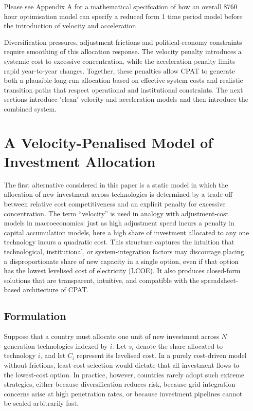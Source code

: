 \documentclass[preprint,authoryear,12pt]{elsarticle}
\begin{document}
Please see Appendix A for a mathematical specifcation of how an overall 8760 hour optimisation model can specify a reduced form 1 time period model before the introduction of velocity and acceleration.


Diversification pressures, adjustment frictions and political-economy
constraints require smoothing of this allocation response. The velocity penalty introduces a systemic cost to excessive concentration, while the acceleration penalty limits rapid year-to-year
changes. Together, these penalties allow CPAT to generate both a plausible long-run allocation
based on effective system costs and realistic transition paths that respect operational and
institutional constraints. The next sections introduce 'clean' velocity and acceleration models and then introduce the combined system.


\newpage

\section{A Velocity-Penalised Model of Investment Allocation}

The first alternative considered in this paper is a static model in which the allocation of new
investment across technologies is determined by a trade-off between relative cost competitiveness
and an explicit penalty for excessive concentration. The term ``velocity'' is used in analogy with
adjustment-cost models in macroeconomics: just as high adjustment speed incurs a penalty in
capital accumulation models, here a high share of investment allocated to any one technology
incurs a quadratic cost. This structure captures the intuition that technological, institutional, or
system-integration factors may discourage placing a disproportionate share of new capacity in a
single option, even if that option has the lowest levelised cost of electricity (LCOE). It also
produces closed-form solutions that are transparent, intuitive, and compatible with the
spreadsheet-based architecture of CPAT.

\subsection{Formulation}

Suppose that a country must allocate one unit of new investment across $N$ generation
technologies indexed by $i$. Let $s_i$ denote the share allocated to technology $i$, and let $C_i$
represent its levelised cost. In a purely cost-driven model without frictions, least-cost selection
would dictate that all investment flows to the lowest-cost option. In practice, however, countries
rarely adopt such extreme strategies, either because diversification reduces risk, because grid
integration concerns arise at high penetration rates, or because investment pipelines cannot be
scaled arbitrarily fast.
\end{document}
